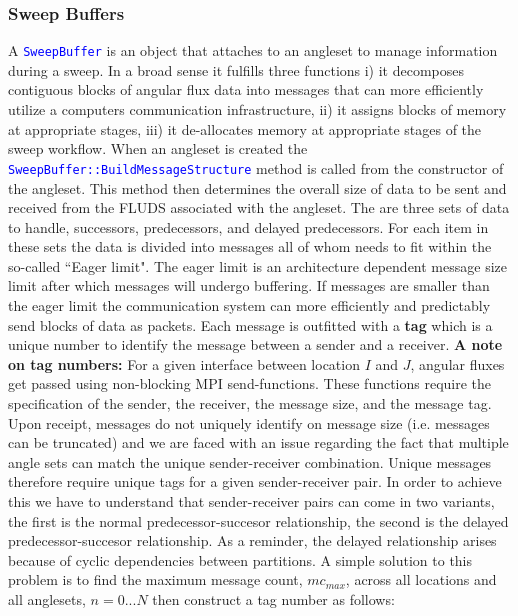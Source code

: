 \documentclass[11pt,letterpaper,titlepage]{article}
\newcommand{\xmltag}[1]{\textcolor{blue}{ \texttt{#1}} }
\numberwithin{equation}{section}
\begin{document}
\subsubsection{Sweep Buffers}
A \xmltag{SweepBuffer} is an object that attaches to an angleset to manage information during a sweep. In a broad sense it fulfills three functions i) it decomposes contiguous blocks of angular flux data into messages that can more efficiently utilize a computers communication infrastructure, ii) it assigns blocks of memory at appropriate stages, iii) it de-allocates memory at appropriate stages of the sweep workflow. 
\newline
\newline
When an angleset is created the \xmltag{SweepBuffer::BuildMessageStructure} method is called from the constructor of the angleset. This method then determines the overall size of data to be sent and received from the FLUDS associated with the angleset. The are three sets of data to handle, successors, predecessors, and delayed predecessors. For each item in these sets the data is divided into messages all of whom needs to fit within the so-called ``Eager limit". The eager limit is an architecture dependent message size limit after which messages will undergo buffering. If messages are smaller than the eager limit the communication system can more efficiently and predictably send blocks of data as packets. Each message is outfitted with a \textbf{tag} which is a unique number to identify the message between a sender and a receiver.
\newline
\newline
\textbf{A note on tag numbers:}\newline
For a given interface between location $I$ and $J$, angular fluxes get passed using non-blocking MPI send-functions. These functions require the specification of the sender, the receiver, the message size, and the message tag. Upon receipt, messages do not uniquely identify on message size (i.e. messages can be truncated) and we are faced with an issue regarding the fact that multiple angle sets can match the unique sender-receiver combination. Unique messages therefore require unique tags for a given sender-receiver pair. In order to achieve this we have to understand that sender-receiver pairs can come in two variants, the first is the normal predecessor-succesor relationship, the second is the delayed predecessor-succesor relationship. As a reminder, the delayed relationship arises because of cyclic dependencies between partitions.
\newline 
\newline
A simple solution to this problem is to find the maximum message count, $mc_{max}$, across all locations and all anglesets, $n=0...N$ then construct a tag number as follows:
\end{document}

